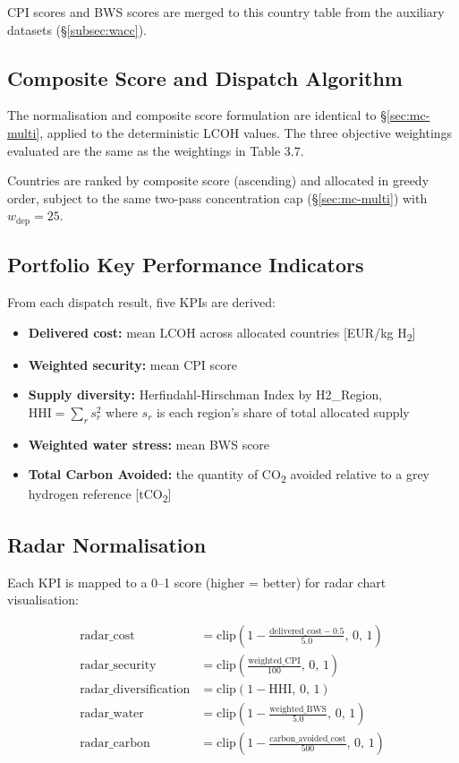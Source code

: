 CPI scores and BWS scores are merged to this country table from the auxiliary datasets (\S\ref{subsec:wacc}).

\subsection{Composite Score and Dispatch Algorithm}

The normalisation and composite score formulation are identical to \S\ref{sec:mc-multi}, applied to the deterministic LCOH values. The three objective weightings evaluated are the same as the weightings in Table 3.7.

Countries are ranked by composite score (ascending) and allocated in greedy order, subject to the same two-pass concentration cap (\S\ref{sec:mc-multi}) with $w_{\text{dep}} = 25$.

\subsection{Portfolio Key Performance Indicators}

From each dispatch result, five KPIs are derived:
\begin{itemize}
    \item \textbf{Delivered cost:} mean LCOH across allocated countries [EUR/kg H\textsubscript{2}]
    \item \textbf{Weighted security:} mean CPI score
    \item \textbf{Supply diversity:} Herfindahl-Hirschman Index by H2\_Region, $\text{HHI} = \sum_r s_r^2$ where $s_r$ is each region's share of total allocated supply
    \item \textbf{Weighted water stress:} mean BWS score
    \item \textbf{Total Carbon Avoided:} the quantity of CO\textsubscript{2} avoided relative to a grey hydrogen reference [tCO\textsubscript{2}]
\end{itemize}

\subsection{Radar Normalisation}

Each KPI is mapped to a 0--1 score (higher = better) for radar chart visualisation:

\begin{align}
    \text{radar\_cost}            &= \text{clip}\!\left(1 - \frac{\text{delivered\_cost} - 0.5}{5.0},\, 0,\, 1\right) \\
    \text{radar\_security}        &= \text{clip}\left(\frac{\text{weighted\_CPI}}{100},\, 0,\, 1\right) \\
    \text{radar\_diversification} &= \text{clip}(1 - \text{HHI},\, 0,\, 1) \\
    \text{radar\_water}           &= \text{clip}\!\left(1 - \frac{\text{weighted\_BWS}}{5.0},\, 0,\, 1\right) \\
    \text{radar\_carbon}          &= \text{clip}\!\left(1 - \frac{\text{carbon\_avoided\_cost}}{500},\, 0,\, 1\right)
\end{align}

